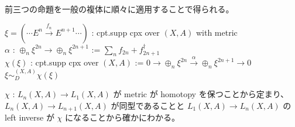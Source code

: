 \documentclass[dvipdfmx]{jsarticle}
\begin{document}
\begin{Proof}[(4)]
\itemprof
  前三つの命題を一般の複体に順々に適用することで得られる。
\end{Proof}

\begin{Theorem}
\itemprop
  \For \(\xi = (\cdots E^{n} \overset{f_{n}}{\to} E^{n+1} \cdots)\) : cpt.supp cpx over \((X,A)\) with metric \\
  \Let \(\alpha\) : \(\oplus_n \xi^{2n} \to \oplus_n \xi^{2n+1}\) := \(\sum_{n} f_{2n} + f_{2n+1}^{\dagger}\) \\
  \Let \(\chi(\xi)\) : cpt.supp cpx over \((X,A)\) := \(0 \to \oplus_n \xi^{2n} \overset{\alpha}{\to} \oplus_n \xi^{2n+1} \to 0\) \\
  \Then \(\xi \sim_{D}^{(X,A)} \chi(\xi)\)
\end{Theorem}

\begin{Proof}
\itemprof
  \(\chi\) : \(L_{n}(X,A) \to L_{1}(X,A)\) が metric が homotopy を保つことから定まり、 \(L_{n}(X,A) \to L_{n+1}(X,A)\) が同型であることと \(L_{1}(X,A) \to L_{n}(X,A)\) の left inverse が \(\chi\) になることから確かにわかる。
\end{Proof}
\end{document}
